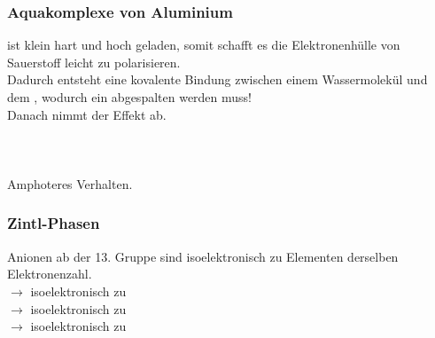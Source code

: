 \documentclass{article}
\begin{document}
\subsubsection{Aquakomplexe von Aluminium}
\begin{center}
\end{center}
 ist klein hart und hoch geladen, somit schafft es die Elektronenhülle von Sauerstoff leicht zu polarisieren.\\
Dadurch entsteht eine kovalente Bindung zwischen einem Wassermolekül und dem , wodurch ein  abgespalten werden muss!\\
Danach nimmt der Effekt ab.\\\\
\\
\\
Amphoteres Verhalten.

\subsubsection{Zintl-Phasen}
Anionen ab der 13. Gruppe sind isoelektronisch zu Elementen derselben Elektronenzahl.\\
 $\rightarrow$  isoelektronisch zu \\
 $\rightarrow$  isoelektronisch zu \\
 $\rightarrow$  isoelektronisch zu 
\end{document}
